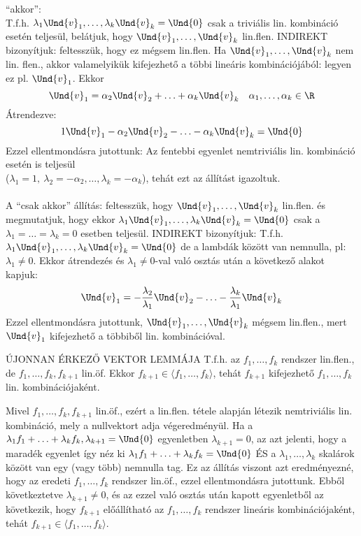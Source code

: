 \begin{bizonyitas}{}
``akkor'':\\
T.f.h. $\lambda_1\Und{v}_1,\ldots,\lambda_k\Und{v}_k = \Und{0}$ csak a triviális lin. kombináció esetén teljesül, belátjuk, hogy $\Und{v}_1,\ldots,\Und{v}_k$ lin.flen. INDIREKT bizonyítjuk: feltesszük, hogy ez mégsem lin.flen. Ha $\Und{v}_1,\ldots,\Und{v}_k$ nem lin. flen., akkor valamelyikük kifejezhető a többi lineáris kombinációjából: legyen ez pl. $\Und{v}_1$. Ekkor $$\Und{v}_1 = \alpha_2\Und{v}_2 + \ldots + \alpha_k\Und{v}_k\quad \alpha_1,\ldots,\alpha_k \in \R$$
Átrendezve: $$1\Und{v}_1-\alpha_2\Und{v}_2 - \ldots - \alpha_k\Und{v}_k = \Und{0}$$
Ezzel ellentmondásra jutottunk: Az fentebbi egyenlet nemtriviális lin. kombináció esetén is teljesül \\($\lambda_1 = 1,\: \lambda_2 = -\alpha_2,\ldots, \lambda_k = -\alpha_k$), tehát ezt az állítást igazoltuk.\\\\
A ``csak akkor'' állítás: feltesszük, hogy  $\Und{v}_1,\ldots,\Und{v}_k$ lin.flen. és megmutatjuk, hogy ekkor  $\lambda_1\Und{v}_1,\ldots,\lambda_k\Und{v}_k = \Und{0}$ csak a $\lambda_1 = \ldots = \lambda_k = 0$ esetben teljesül. INDIREKT bizonyítjuk: T.f.h. $\lambda_1\Und{v}_1,\ldots,\lambda_k\Und{v}_k = \Und{0}$ de a lambdák között van nemnulla, pl: $\lambda_1 \neq 0$. Ekkor átrendezés és $\lambda_1 \neq 0$-val való osztás után a következő alakot kapjuk:
$$\Und{v}_1 = -\frac{\lambda_2}{\lambda_1}\Und{v}_2-\ldots-\frac{\lambda_k}{\lambda_1}\Und{v}_k$$
Ezzel ellentmondásra jutottunk, $\Und{v}_1,\ldots,\Und{v}_k$ mégsem lin.flen., mert $\Und{v}_1$ kifejezhető a többiből lin. kombinációval.
\end{bizonyitas}

\begin{tetel}{ÚJONNAN ÉRKEZŐ VEKTOR LEMMÁJA}
T.f.h. az $f_1,\ldots,f_k$ rendszer lin.flen., de $f_1,\ldots,f_k,f_{k+1}$ lin.öf. Ekkor $f_{k+1} \in \langle f_1,\ldots,f_k \rangle$, tehát $f_{k+1}$ kifejezhető $f_1,\ldots,f_k$ lin. kombinációjaként.
\end{tetel}

\begin{bizonyitas}{}
Mivel $f_1,\ldots,f_k,f_{k+1}$ lin.öf., ezért a lin.flen. tétele alapján létezik nemtriviális lin. kombináció, mely a nullvektort adja végeredményül. Ha a
$\lambda_1f_1+\ldots+\lambda_kf_k,\lambda_{k+1} = \Und{0}$  egyenletben $\lambda_{k+1} = 0$, az azt jelenti, hogy a maradék egyenlet így néz ki $\lambda_1f_1+\ldots+\lambda_kf_k = \Und{0}$ ÉS a $\lambda_1,\ldots,\lambda_k$ skalárok között van egy (vagy több) nemnulla tag. Ez az állítás viszont azt eredményezné, hogy az eredeti $f_1,\ldots,f_k$ rendszer lin.öf., ezzel ellentmondásra jutottunk. Ebből következtetve $\lambda_{k+1} \neq 0$, és az ezzel való osztás után kapott egyenletből az következik, hogy $f_{k+1}$ előállítható az $f_1,\ldots,f_k$ rendszer lineáris kombinációjaként, tehát $f_{k+1} \in \langle f_1,\ldots,f_k \rangle$.
\end{bizonyitas}

